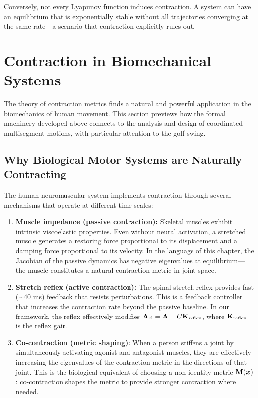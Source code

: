 \begin{remark}
Conversely, not every Lyapunov function induces contraction. A system can have an
equilibrium that is exponentially stable without all trajectories converging at the
same rate---a scenario that contraction explicitly rules out.
\end{remark}


\section{Contraction in Biomechanical Systems}

The theory of contraction metrics finds a natural and powerful application in the
biomechanics of human movement. This section previews how the formal machinery developed
above connects to the analysis and design of coordinated multisegment motions, with
particular attention to the golf swing.

\subsection{Why Biological Motor Systems are Naturally Contracting}

The human neuromuscular system implements contraction through several mechanisms that
operate at different time scales:

\begin{enumerate}
\item \textbf{Muscle impedance (passive contraction):} Skeletal muscles exhibit intrinsic
      viscoelastic properties. Even without neural activation, a stretched muscle generates
      a restoring force proportional to its displacement and a damping force proportional
      to its velocity. In the language of this chapter, the Jacobian of the passive
      dynamics has negative eigenvalues at equilibrium---the muscle constitutes a natural
      contraction metric in joint space.

\item \textbf{Stretch reflex (active contraction):} The spinal stretch reflex provides
      fast ($\sim$40 ms) feedback that resists perturbations. This is a feedback controller
      that increases the contraction rate beyond the passive baseline. In our framework,
      the reflex effectively modifies $\mathbf{A}_{\text{cl}} = \mathbf{A} - G\mathbf{K}_{\text{reflex}}$,
      where $\mathbf{K}_{\text{reflex}}$ is the reflex gain.

\item \textbf{Co-contraction (metric shaping):} When a person stiffens a joint by
      simultaneously activating agonist and antagonist muscles, they are effectively
      increasing the eigenvalues of the contraction metric in the directions of that joint.
      This is the biological equivalent of choosing a non-identity metric $\mathbf{M}(\bm{x})$:
      co-contraction shapes the metric to provide stronger contraction where needed.
\end{enumerate}

